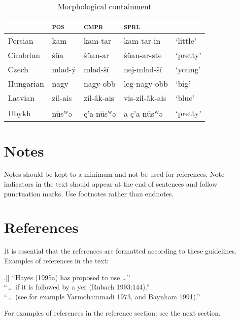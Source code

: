 \documentclass[times,linguex]{lsb}
\begin{document}
\begin{table}[h]
\centering
\caption{Morphological containment}	
\begin{tabular}{lllll}
 & \textsc{pos} & \textsc{cmpr} & \textsc{sprl}\\
\hline 
Persian & kam & kam-tar & kam-tar-in & ‘little’\\
Cimbrian & šüa & šüan-ar & šüan-ar-ste & ‘pretty’ \\
Czech & mlad-ý & mlad-ší & nej-mlad-ší & ‘young’\\
Hungarian & nagy & nagy-obb & leg-nagy-obb & ‘big’\\
Latvian & zil-ais & zil-âk-ais & vis-zil-âk-ais & ‘blue’\\
Ubykh &  nüs\textsuperscript{w}ə & ç’a-nüs\textsuperscript{w}ə & a-ç’a-nüs\textsuperscript{w}ə & ‘pretty’ \\
\end{tabular}\label{tbl:table1}
\end{table}


\section{Notes}

Notes should be kept to a minimum and not be used for references. Note indicators in the text should appear at the end of sentences and follow punctuation marks. Use footnotes rather than endnotes.

\section{References}

It is essential that the references are formatted according to these guidelines. Examples of references in the text:

\ex.[]
 ``Hayes (1995a) has proposed to use \ldots''\\
``\ldots\ if it is followed by a yer (Rubach 1993:144).''\\
``\ldots\ (see for example Yarmohammadi 1973, and Baynham 1991).''

For examples of references in the reference section: see the next section.


\nocite{*} %
\end{document}
